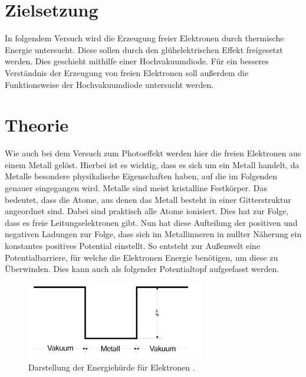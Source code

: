 %

%
\section{Zielsetzung}
\label{sec:Theorie}

In folgendem Versuch wird die Erzeugung freier Elektronen durch thermische Energie untersucht. Diese sollen durch den 
glühelektrischen Effekt freigesetzt werden. Dies geschieht mithilfe einer Hochvakuumdiode. Für ein besseres Verständnis 
der Erzeugung von freien Elektronen soll außerdem die Funktionsweise der Hochvakuumdiode untersucht werden. 

\section{Theorie \cite{Versuchsanleitung_v504}}

Wie auch bei dem Versuch zum Photoeffekt werden hier die freien Elektronen aus einem Metall gelöst. Hierbei ist es 
wichtig, dass es sich um ein Metall handelt, da Metalle besondere physikalische Eigenschaften haben, auf die im 
Folgenden genauer eingegangen wird. Metalle sind meist kristalline Festkörper. Das bedeutet, dass die Atome, aus denen 
das Metall besteht in einer Gitterstruktur angeordnet sind. Dabei sind praktisch alle Atome ionisiert. Dies hat zur Folge, 
dass es freie Leitungselektronen gibt. Nun hat diese Aufteilung der positiven und negativen Ladungen zur Folge, dass sich 
im Metallinneren in nullter Näherung ein konstantes positives Potential einstellt. So entsteht zur Außenwelt eine 
Potentialbarriere, für welche die Elektronen Energie benötigen, um diese zu Überwinden. Dies kann auch als folgender 
Potentialtopf aufgeefasst werden.

\begin{figure}
    \centering
    \includegraphics[width=0.69\textwidth]{content/Potentialtopf.png}
    \caption{Darstellung der Energiehürde für Elektronen \cite{Versuchsanleitung_v504}.}
\end{figure}

